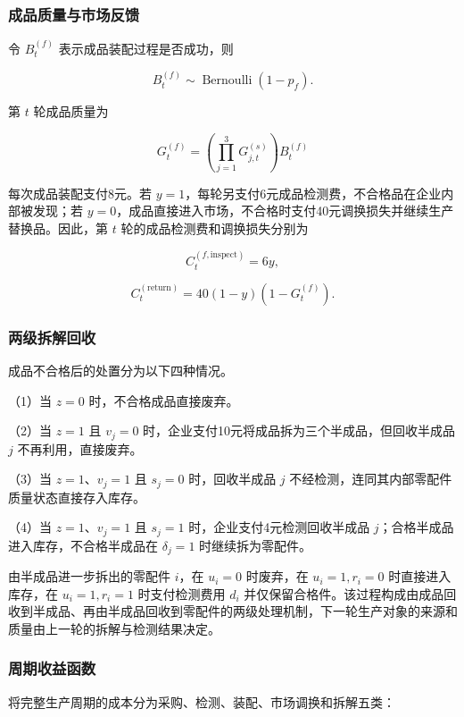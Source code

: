\documentclass{cumcm}
\numberwithin{figure}{section}
\numberwithin{table}{section}
\begin{document}
\subsubsection{成品质量与市场反馈}\label{ux6210ux54c1ux8d28ux91cfux4e0eux5e02ux573aux53cdux9988}

令 \(B_t^{(f)}\) 表示成品装配过程是否成功，则

\[
B_t^{(f)}\sim\operatorname{Bernoulli}(1-p_f).
\]

第 \(t\) 轮成品质量为

\[
G_t^{(f)}=
\left(\prod_{j=1}^{3}G_{j,t}^{(s)}\right)B_t^{(f)}
\]

每次成品装配支付8元。若 \(y=1\)，每轮另支付6元成品检测费，不合格品在企业内部被发现；若 \(y=0\)，成品直接进入市场，不合格时支付40元调换损失并继续生产替换品。因此，第 \(t\) 轮的成品检测费和调换损失分别为

\[
C_t^{(f,\mathrm{inspect})}=6y,
\]

\[
C_t^{(\mathrm{return})}=40(1-y)(1-G_t^{(f)}).
\]

\subsubsection{两级拆解回收}\label{ux4e24ux7ea7ux62c6ux89e3ux56deux6536}

成品不合格后的处置分为以下四种情况。

（1）当 \(z=0\) 时，不合格成品直接废弃。

（2）当 \(z=1\) 且 \(v_j=0\) 时，企业支付10元将成品拆为三个半成品，但回收半成品 \(j\) 不再利用，直接废弃。

（3）当 \(z=1\)、\(v_j=1\) 且 \(s_j=0\) 时，回收半成品 \(j\) 不经检测，连同其内部零配件质量状态直接存入库存。

（4）当 \(z=1\)、\(v_j=1\) 且 \(s_j=1\) 时，企业支付4元检测回收半成品 \(j\)；合格半成品进入库存，不合格半成品在 \(\delta_j=1\) 时继续拆为零配件。

由半成品进一步拆出的零配件 \(i\)，在 \(u_i=0\) 时废弃，在 \(u_i=1,r_i=0\) 时直接进入库存，在 \(u_i=1,r_i=1\) 时支付检测费用 \(d_i\) 并仅保留合格件。该过程构成由成品回收到半成品、再由半成品回收到零配件的两级处理机制，下一轮生产对象的来源和质量由上一轮的拆解与检测结果决定。

\subsubsection{周期收益函数}\label{ux5468ux671fux6536ux76caux51fdux6570}

将完整生产周期的成本分为采购、检测、装配、市场调换和拆解五类：
\end{document}
